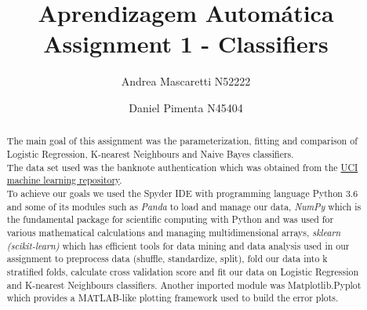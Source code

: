 \documentclass[a4paper]{article}
\title{\textbf{Aprendizagem Autom\'{a}tica} \\
\large Assignment 1 - Classifiers}
\author{Andrea Mascaretti N52222\and Daniel Pimenta N45404}
\begin{document}
\maketitle
\begin{abstract}
The main goal of this assignment was the parameterization, fitting and comparison of Logistic Regression,
 K-nearest Neighbours and Naive Bayes classifiers.\\ 
The data set used was the banknote authentication which was obtained from the
 \href{https://archive.ics.uci.edu/ml/datasets/banknote+authentication}{UCI machine learning repository}.\\
To achieve our goals we used the Spyder IDE with programming language Python 3.6 and some of its modules 
such as \textit{Panda} to load and manage our data, \textit{NumPy} which is the fundamental package for 
scientific computing with Python and was used for various mathematical calculations and managing multidimensional 
arrays, \textit{sklearn (scikit-learn)} which has efficient tools for data mining and data analysis used in our assignment 
to preprocess data (shuffle, standardize, split), fold our data into k stratified folds, calculate cross validation score and 
fit our data on Logistic Regression and K-nearest Neighbours classifiers. Another imported module was Matplotlib.Pyplot
 which provides a MATLAB-like plotting framework used to build the error plots. 
\end{abstract}

\end{document}
